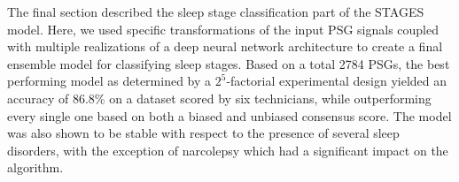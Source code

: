 The%
\graffito{\ref{question:sleep-stages-guarantee}: \questionSleepStageGuarantee} %
final section described the sleep stage classification part of the \ac{STAGES} model.
Here, we used specific transformations of the input \ac{PSG} signals coupled with multiple realizations of a deep neural network architecture to create a final ensemble model for classifying sleep stages.
Based on a total 2784 \acp{PSG}, the best performing model as determined by a \(2^5\)-factorial experimental design yielded an accuracy of 86.8\% on a dataset scored by six technicians, while outperforming every single one based on both a biased and unbiased consensus score.
The model was also shown to be stable with respect to the presence of several sleep disorders, with the exception of narcolepsy which had a significant impact on the algorithm.